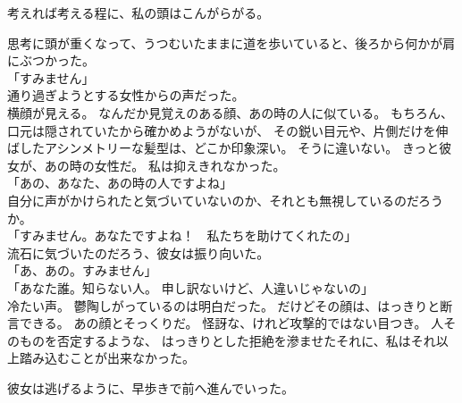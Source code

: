 \documentclass[../IHMain]{subfiles}
\begin{document}
考えれば考える程に、私の頭はこんがらがる。

思考に頭が重くなって、うつむいたままに道を歩いていると、後ろから何かが肩にぶつかった。\\
「すみません」\\
通り過ぎようとする女性からの声だった。\\
横顔が見える。
なんだか見覚えのある顔、あの時の人に似ている。
もちろん、口元は隠されていたから確かめようがないが、
その鋭い目元や、片側だけを伸ばしたアシンメトリーな髪型は、どこか印象深い。
そうに違いない。
きっと彼女が、あの時の女性だ。
私は抑えきれなかった。\\
「あの、あなた、あの時の人ですよね」\\
自分に声がかけられたと気づいていないのか、それとも無視しているのだろうか。\\
「すみません。あなたですよね！　私たちを助けてくれたの」\\
流石に気づいたのだろう、彼女は振り向いた。\\
「あ、あの。すみません」\\
「あなた誰。知らない人。
申し訳ないけど、人違いじゃないの」\\
冷たい声。
鬱陶しがっているのは明白だった。
だけどその顔は、はっきりと断言できる。
あの顔とそっくりだ。
怪訝な、けれど攻撃的ではない目つき。
人そのものを否定するような、
はっきりとした拒絶を滲ませたそれに、私はそれ以上踏み込むことが出来なかった。

彼女は逃げるように、早歩きで前へ進んでいった。
\end{document}
